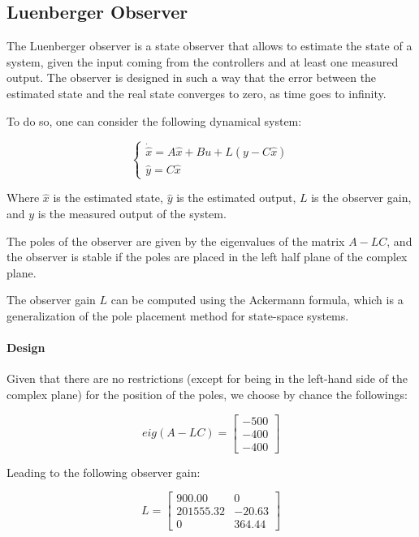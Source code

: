 \subsection{Luenberger Observer}
\label{sec:luenberger_observer}

The Luenberger observer is a state observer that allows to estimate the state of a system, given the input coming from the controllers and at least one measured output.
The observer is designed in such a way that the error between the estimated state and the real state converges to zero, as time goes to infinity.

To do so, one can consider the following dynamical system:

\begin{equation}
    \begin{cases}
        \dot{\hat{x}} = A \hat{x} + B u + L(y - C \hat{x}) \\
        \hat{y} = C \hat{x}
    \end{cases}
    \label{eq:observer_dynamics}
\end{equation}

Where $\hat{x}$ is the estimated state, $\hat{y}$ is the estimated output, $L$ is the observer gain, and $y$ is the measured output of the system.

The poles of the observer are given by the eigenvalues of the matrix $A - LC$, and the observer is stable if the poles are placed in the left half plane of the complex plane.

The observer gain $L$ can be computed using the Ackermann formula, which is a generalization of the pole placement method for state-space systems.

\paragraph{Design}

Given that there are no restrictions (except for being in the left-hand side of the complex plane) for the position of the poles, we choose by chance the followings:

\begin{equation}
    eig(A-LC) =
    \begin{bmatrix}
        -500 \\
        -400 \\
        -400
    \end{bmatrix}
    \label{eq:luenberger_observer_poles}
\end{equation}

Leading to the following observer gain:

\begin{equation}
    L =
    \begin{bmatrix}
        900.00    & 0      \\
        201555.32 & -20.63 \\
        0         & 364.44
    \end{bmatrix}
    \label{eq:L_luemberg}
\end{equation}
